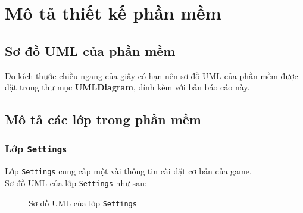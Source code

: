\section{Mô tả thiết kế phần mềm}
\subsection{Sơ đồ UML của phần mềm}
Do kích thước chiều ngang của giấy có hạn nên sơ đồ UML của phần mềm được đặt trong thư mục \textbf{UMLDiagram}, đính kèm với bản báo cáo này.

\subsection{Mô tả các lớp trong phần mềm}
\subsubsection{Lớp \lstinline{Settings}}
Lớp \lstinline{Settings} cung cấp một vài thông tin cài dặt cơ bản của game.\\
Sơ đồ UML của lớp \lstinline{Settings} như sau:

\begin{figure}[H]
\caption{Sơ đồ UML của lớp \lstinline{Settings}}
\end{figure} 

